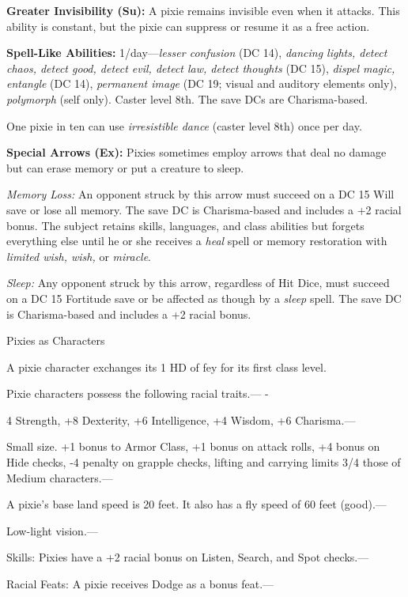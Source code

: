 \documentclass{article}
\begin{document}
\textbf{Greater Invisibility (Su):} A pixie remains invisible even when it attacks. 
This ability is constant, but the pixie can suppress or resume it as a free action.

\textbf{Spell-Like Abilities:} 1/day---\textit{lesser confusion }(DC 14), \textit{dancing 
lights, detect chaos, detect good, detect evil, detect law, detect thoughts }(DC 
15), \textit{dispel magic, entangle }(DC 14), \textit{permanent image }(DC 19; 
visual and auditory elements only), \textit{polymorph }(self only). Caster level 
8th. The save DCs are Charisma-based.

One pixie in ten can use \textit{irresistible dance }(caster level 8th) once per 
day.

\textbf{Special Arrows (Ex): }Pixies sometimes employ arrows that deal no damage 
but can erase memory or put a creature to sleep. 

\textit{Memory Loss: }An opponent struck by this arrow must succeed on a DC 15 
Will save or lose all memory. The save DC is Charisma-based and includes a +2 racial 
bonus. The subject retains skills, languages, and class abilities but forgets everything 
else until he or she receives a \textit{heal }spell or memory restoration with 
\textit{limited wish, wish, }or \textit{miracle}.

\textit{Sleep: }Any opponent struck by this arrow, regardless of Hit Dice, must 
succeed on a DC 15 Fortitude save or be affected as though by a \textit{sleep }spell. 
The save DC is Charisma-based and includes a +2 racial bonus.

Pixies as Characters

A pixie character exchanges its 1 HD of fey for its first class level.

Pixie characters possess the following racial traits.--- -

\parindent=3pt
4 Strength, +8 Dexterity, +6 Intelligence, +4 Wisdom, +6 Charisma.---

\parindent=0pt
Small size. +1 bonus to Armor Class, +1 bonus on attack rolls, +4 bonus on Hide 
checks, -4 penalty on grapple checks, lifting and carrying limits 3/4 those of 
Medium characters.---

A pixie's base land speed is 20 feet. It also has a fly speed of 60 feet (good).---

Low-light vision.---

Skills: Pixies have a +2 racial bonus on Listen, Search, and Spot checks.---

Racial Feats: A pixie receives Dodge as a bonus feat.--- 
\end{document}
